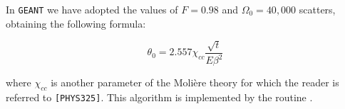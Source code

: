In {\tt GEANT} we have adopted the values of $F=0.98$ and $\Omega_0 = 40,000$
scatters, obtaining the following formula:

\[
\theta_0 = 2.557 \chi_{cc} \frac{\sqrt{t}}{E \beta^2}
\]

where $\chi_{cc}$ is another parameter of the Moli\`{e}re theory
for which the reader is referred to {\tt [PHYS325]}. This algorithm
is implemented by the routine .
